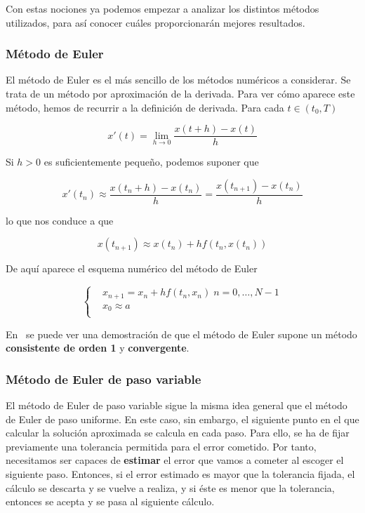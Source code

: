 Con estas nociones ya podemos empezar a analizar los distintos métodos
utilizados, para así conocer cuáles proporcionarán mejores resultados. 

\subsubsection{Método de Euler}
\label{makereference5.4.3.1}

El método de Euler es el más sencillo de los métodos numéricos a considerar. Se
trata de un método por aproximación de la derivada. Para ver cómo aparece este
método, hemos de recurrir a la definición de derivada. Para cada $t \in (t_0,T)$

\begin{equation}
		x'(t) = \lim_{h \to 0} \frac{x(t+h) - x(t)}{h} 	
\end{equation}

Si $h>0$ es suficientemente pequeño, podemos suponer que

\begin{equation}
		x'(t_n)\approx \frac{x(t_n+h) - x(t_n)}{h} = \frac{x(t_{n+1}) -
		x(t_n)}{h}	
\end{equation}

lo que nos conduce a que

\begin{equation}
		x(t_{n+1}) \approx x(t_n) + hf(t_n,x(t_n))	
\end{equation}

De aquí aparece el esquema numérico del método de Euler

\begin{equation}
		\left\{ \begin{aligned}
				& x_{n+1} = x_n + hf(t_n,x_n) \; n=0,\ldots,N-1 \\
				& x_0 \approx a \\
		\end{aligned} \right.
\end{equation}

En~\citet{ANNU} se puede ver una demostración de que el método de Euler supone
un método \textbf{consistente de orden 1} y \textbf{convergente}.

\subsubsection{Método de Euler de paso variable}
\label{makereference5.4.3.2}

El método de Euler de paso variable sigue la misma idea general que el método de
Euler de paso uniforme. En este caso, sin embargo, el siguiente punto en el que
calcular la solución aproximada se calcula en cada paso. Para ello, se ha de
fijar previamente una tolerancia permitida para el error cometido. Por tanto,
necesitamos ser capaces de \textbf{estimar} el error que vamos a cometer al
escoger el siguiente paso. Entonces, si el error estimado es mayor que la
tolerancia fijada, el cálculo se descarta y se vuelve a realiza, y si éste es
menor que la tolerancia, entonces se acepta y se pasa al siguiente cálculo.

